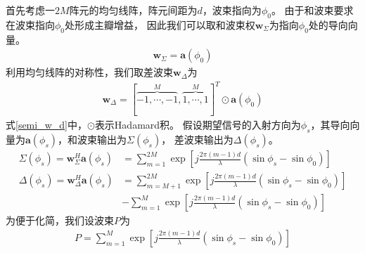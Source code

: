 \documentclass[master]{thesis-uestc}
\begin{document}
首先考虑一$2M$阵元的均匀线阵，阵元间距为$d$，波束指向为$\phi_0$。
由于和波束要求在波束指向$\phi_0$处形成主瓣增益，
因此我们可以取和波束权$\bm{w}_\Sigma$为指向$\phi_0$处的导向向量。
\begin{equation}\label{semi_w_s}
    \begin{aligned}
        \bm{w}_\Sigma = \bm{a}(\phi_0)
    \end{aligned}
\end{equation}
利用均匀线阵的对称性，我们取差波束$\bm{w}_\Delta$为
\begin{equation}\label{semi_w_d}
    \begin{aligned}
        \bm{w}_\Delta = [\overbrace{-1,\cdots,-1}^M,
                              \overbrace{1,\cdots,1}^M]^T \odot \bm{a}(\phi_0)
    \end{aligned}
\end{equation}
式\eqref{semi_w_d}中，$\odot$表示Hadamard积。
假设期望信号的入射方向为$\phi_s$，其导向向量为$\bm{a}(\phi_s)$，和波束输出为$\Sigma(\phi_s)$，
差波束输出为$\Delta(\phi_s)$。
\begin{subequations}\label{delta_and_sigma}
    \begin{align}
        \Sigma(\phi_s)  = \bm{w}_\Sigma^H\bm{a}(\phi_s)
                       &= \sum_{m=1}^{2M}\exp\left[
                                           j\frac{2\pi(m-1)d}{\lambda}(\sin\phi_s-\sin\phi_0)
                                           \right]
        \\
        \Delta(\phi_s)  = \bm{w}_\Delta^H\bm{a}(\phi_s)
                       &= \sum_{m=M+1}^{2M}\exp\left[
                                             j\frac{2\pi(m-1)d}{\lambda}(\sin\phi_s-\sin\phi_0)
                                             \right] \\
                       \nonumber
                       &- \sum_{m=1}^{M}\exp\left[
                                             j\frac{2\pi(m-1)d}{\lambda}(\sin\phi_s-\sin\phi_0)
                                             \right]
    \end{align}
\end{subequations}
为便于化简，我们设波束$P$为
\begin{equation}\label{semi_pattern}
    \begin{aligned}
        P = \sum_{m=1}^{M}\exp\left[
                                   j\frac{2\pi(m-1)d}{\lambda}(\sin\phi_s-\sin\phi_0)
                               \right]
    \end{aligned}
\end{equation}
\end{document}
